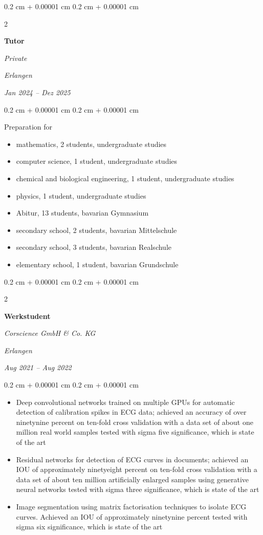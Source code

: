 \documentclass[10pt, letterpaper]{article}
\newenvironment{highlights}{
    \begin{itemize}[
        topsep=0.10 cm,
        parsep=0.10 cm,
        partopsep=0pt,
        itemsep=0pt,
        leftmargin=0.4 cm + 10pt
    ]
}{
    \end{itemize}
}
\newenvironment{onecolentry}{
    \begin{adjustwidth}{
        0.2 cm + 0.00001 cm
    }{
        0.2 cm + 0.00001 cm
    }
}{
    \end{adjustwidth}
}
\newenvironment{twocolentry}[2][]{
    \onecolentry
    \def\secondColumn{#2}
    \setcolumnwidth{\fill, 4.5 cm}
    \begin{paracol}{2}
}{
    \switchcolumn \raggedleft \secondColumn
    \end{paracol}
    \endonecolentry
}
\begin{document}
\begin{twocolentry}{
    \textit{Erlangen}    
    
    \textit{Jan 2024 – Dez 2025}}
    \textbf{Tutor}
    
    \textit{Private}
\end{twocolentry}

\vspace{0.10 cm}
\begin{onecolentry}
    Preparation for
	\begin{highlights}
		\item mathematics, 2 students, undergraduate studies
		\item computer science, 1 student, undergraduate studies
        \item chemical and biological engineering, 1 student, undergraduate studies
        \item physics, 1 student, undergraduate studies
        \item Abitur, 13 students, bavarian Gymnasium
        \item secondary school, 2 students, bavarian Mittelschule
        \item secondary school, 3 students, bavarian Realschule
        \item elementary school, 1 student, bavarian Grundschule
	\end{highlights}
\end{onecolentry}
\vspace{0.2 cm}

\begin{twocolentry}{
    \textit{Erlangen}    
    
    \textit{Aug 2021 – Aug 2022}}
    \textbf{Werkstudent}
    
    \textit{Corscience GmbH \& Co. KG}
\end{twocolentry}

\vspace{0.10 cm}
\begin{onecolentry}
	\begin{highlights}
		\item Deep convolutional networks trained on multiple GPUs for automatic detection of calibration spikes in ECG data; achieved an accuracy of over ninetynine percent on ten-fold cross validation with a data set of about one million real world samples tested with sigma five significance, which is state of the art
        \item Residual networks for detection of ECG curves in documents; achieved an IOU of approximately ninetyeight percent on ten-fold cross validation with a data set of about ten million artificially enlarged samples using generative neural networks tested with sigma three significance, which is state of the art
        \item Image segmentation using matrix factorisation techniques to isolate ECG curves. Achieved an IOU of approximately ninetynine percent tested with sigma six significance, which is state of the art
	\end{highlights}
\end{onecolentry}
\vspace{0.2 cm}
\end{document}
